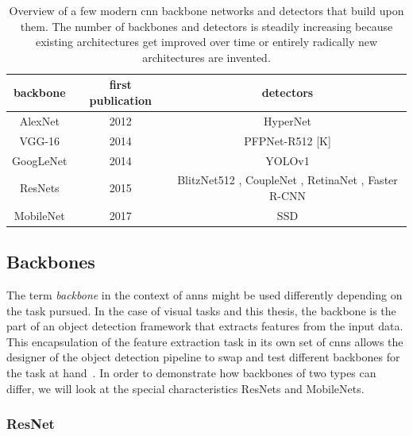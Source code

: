 \documentclass[
			   fontsize=11pt,
               paper=a4,
               bibliography=totoc,
               idxtotoc,
               headsepline,
               footsepline,
               footinclude=false,
               BCOR=12mm,
               DIV=13,
               openany,   %
               oneside    %
               ]
               {scrbook}
\begin{document}
\begin{table}[H]
	\begin{tabularx}{\columnwidth}{C | C | C}
		\hline
		backbone					& first publication & detectors \\
		\hline \hline
		AlexNet						  & 2012 \cite{backboneAlexNet}			& HyperNet \cite{detectorHyperNet} \\
		\hline
		VGG-16						 & 2014 \cite{backboneVGG}			   & PFPNet-R512 [K] \\
		\hline
		GoogLeNet			   	   & 2014 \cite{backboneGoogLeNet}			 & YOLOv1 \cite{detectorYOLOv1} \\
		\hline
		ResNets					  	  & 2015 \cite{backboneResNet}		   & BlitzNet512 \cite{detectorBlitzNet}, CoupleNet \cite{detectorCoupleNet}, RetinaNet \cite{detectorRetinaNet},  Faster R-CNN \cite{ren2015faster} \\
		\hline
		MobileNet					 & 2017 \cite{backboneMobileNet}					 & SSD \cite{detectorSSD} \\		
	\end{tabularx}
	\caption[Modern CNN Backbones and Detectors]{Overview of a few modern \gls{cnn} backbone networks and detectors that build upon them. The number of backbones and detectors is steadily increasing because existing architectures get improved over time or entirely radically new architectures are invented.}
	\label{tab:backbonesDetectors}
\end{table}


\subsection{Backbones} \label{ssec:backbones}

The term \textit{backbone} in the context of \glspl{ann} might be used differently depending on the task pursued. In the case of visual tasks and this thesis, the backbone is the part of an object detection framework that extracts features from the input data. This encapsulation of the feature extraction task in its own set of \glspl{cnn} allows the designer of the object detection pipeline to swap and test different backbones for the task at hand~\cite{backbones}. In order to demonstrate how backbones of two types can differ, we will look at the special characteristics ResNets and MobileNets.

\subsubsection{ResNet}
\end{document}
